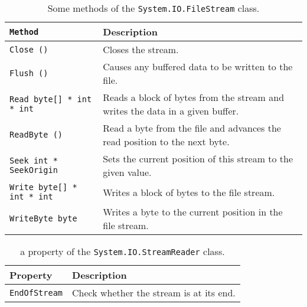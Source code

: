 \begin{table}
  \centering
  \begin{tabularx}{\linewidth}{|l|X|}
    \hline
    \lstinline{Method} & Description\\
    \hline
    \lstinline{Close ()} & Closes the stream.\\
    \hline
    \lstinline{Flush ()} & Causes any buffered data to be written to the file.\\
    \hline
    \lstinline{Read byte[] * int * int} & Reads a block of bytes from the stream and writes the data in a given buffer.\\
    \hline
    \lstinline{ReadByte ()} & Read a byte from the file and advances the read position to the next byte.\\
    \hline
    \lstinline{Seek int * SeekOrigin} & Sets the current position of this stream to the given value.\\
    \hline
    \lstinline{Write byte[] * int * int} & Writes a block of bytes to the file stream.\\
    \hline
    \lstinline{WriteByte byte} & Writes a byte to the current position in the file stream.\\
    \hline
  \end{tabularx}
  \caption{Some methods of the \lstinline!System.IO.FileStream! class.}
  \label{tab:fileStreamMethods}
\end{table}
\begin{table}
  \centering
  \begin{tabularx}{\linewidth}{|l|X|}
    \hline
    Property & Description\\
    \hline
    \lstinline{EndOfStream} & Check whether the stream is at its end.\\
    \hline
  \end{tabularx}
  \caption{a property of the \lstinline!System.IO.StreamReader! class.}
  \label{tab:streamReaderProperties}
\end{table}
